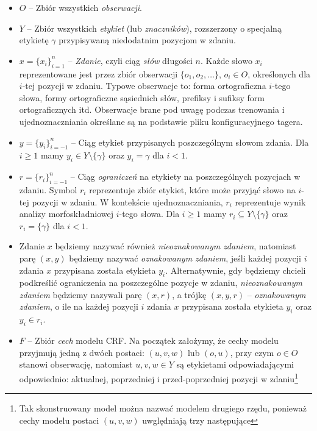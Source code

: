 \documentclass[a4paper,10]{article}
\begin{document}
\begin{itemize}
\item $O$ -- Zbiór wszystkich \emph{obserwacji}.
\item $Y$ -- Zbiór wszystkich \emph{etykiet} (lub \emph{znaczników}),
rozszerzony o specjalną etykietę $\gamma$ przypisywaną niedodatnim
pozycjom w zdaniu.
\item $x = \lbrace x_i \rbrace_{i=1}^n$ -- \emph{Zdanie},
czyli ciąg \emph{słów} długości $n$. 
Każde słowo $x_i$ reprezentowane jest przez zbiór obserwacji
$\lbrace o_1, o_2, \ldots \rbrace$, $o_i \in O$, określonych dla $i$-tej
pozycji w zdaniu. Typowe obserwacje to: forma ortograficzna
$i$-tego słowa, formy ortograficzne sąsiednich słów, prefiksy i sufiksy
form ortograficznych itd. Obserwacje brane pod uwagę podczas trenowania
i ujednoznaczniania określane są na podstawie pliku konfiguracyjnego tagera.
\item $y = \lbrace y_i \rbrace_{i=-1}^n$ -- Ciąg etykiet
przypisanych poszczególnym słowom zdania.
Dla $i \geq 1$ mamy $y_i \in Y \setminus \lbrace \gamma \rbrace$
oraz $y_i = \gamma$ dla $i < 1$.
\item $r = \lbrace r_i \rbrace_{i=-1}^n$ -- Ciąg \emph{ograniczeń}
na etykiety na poszczególnych pozycjach w zdaniu.
Symbol $r_i$ reprezentuje zbiór etykiet, które może
przyjąć słowo na $i$-tej pozycji w zdaniu.
W kontekście ujednoznaczniania, $r_i$ reprezentuje
wynik analizy morfoskładniowej $i$-tego słowa.
Dla $i \geq 1$ mamy $r_i \subseteq Y \setminus \lbrace \gamma \rbrace$
oraz $r_i = \lbrace \gamma \rbrace$ dla $i < 1$.
\item Zdanie $x$ będziemy nazywać również \emph{nieoznakowanym zdaniem},
natomiast parę $(x, y)$ będziemy nazywać \emph{oznakowanym zdaniem},
jeśli każdej pozycji $i$ zdania $x$ przypisana została etykieta $y_i$.
Alternatywnie, gdy będziemy chcieli podkreślić ograniczenia na poszczególne
pozycje w zdaniu, \emph{nieoznakowanym zdaniem} będziemy nazywali parę $(x, r)$,
a trójkę $(x, y, r)$ -- \emph{oznakowanym zdaniem}, o ile na każdej pozycji $i$
zdania $x$ przypisana została etykieta $y_i$ oraz $y_i \in r_i$.
\item $F$ -- Zbiór \emph{cech} modelu CRF. 
Na początek założymy, że cechy modelu przyjmują jedną z dwóch postaci:
$(u, v, w)$ lub $(o, u)$,
przy czym $o \in O$ stanowi obserwację, natomiast $u, v, w \in Y$ są etykietami
odpowiadającymi odpowiednio: aktualnej, poprzedniej i przed-poprzedniej
pozycji w zdaniu\footnote{Tak skonstruowany model można nazwać modelem drugiego
rzędu, ponieważ cechy modelu postaci $(u, v, w)$ uwględniają trzy następujące
}
\end{itemize}
\end{document}
